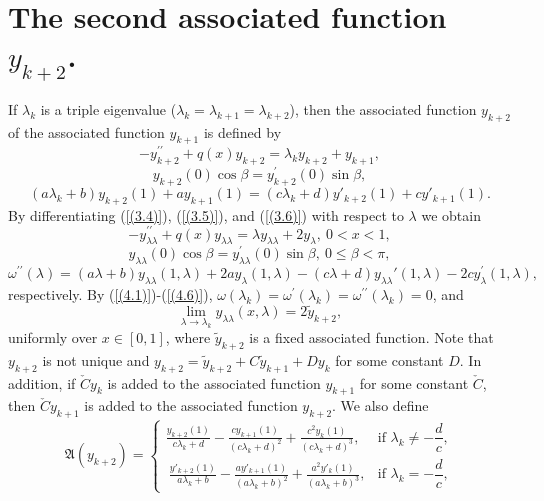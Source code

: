 \documentclass[pdflatex,sn-mathphys-num]{sn-jnl}%
\theoremstyle{thmstyleone}%
\theoremstyle{thmstyletwo}%
\theoremstyle{thmstylethree}%
\theoremstyle{definition}
\theoremstyle{remark}
\numberwithin{equation}{section}
\begin{document}
\section{The second associated function \(y_{k + 2}\).}
If \(\lambda_{k}\) is a triple  eigenvalue
(\(\lambda_{k} = \lambda_{k + 1}=\lambda_{k + 2}\)), then the associated function
\(y_{k + 2}\) of the associated function \(y_{k+1}\) is defined by
\begin{equation}
 -y_{k+2}^{\prime \prime }+q(x)y_{k+2}=\lambda _{k}y_{k+2}+y_{k+1}, \label{(4.1)}  
\end{equation}
\begin{equation}
   y_{k+2}(0)\cos \beta  =y_{k+2}^{\prime }(0)\sin \beta,     \label{(4.2)}
\end{equation}
\begin{equation}
 \left( a\lambda_{k} + b \right)y_{k + 2}(1) + ay_{k + 1}(1) = \left( c\lambda_{k} + d \right)y'_{k + 2}(1) + cy'_{k + 1}(1).  \label{(4.3)}   
\end{equation}
By differentiating (\ref{(3.4)}), (\ref{(3.5)}), and (\ref{(3.6)}) with respect to $\lambda$ we obtain 
\begin{equation}
  -y_{\lambda\lambda}^{\prime \prime }+q(x)y_{\lambda\lambda}=\lambda y_{\lambda\lambda}+2y_{\lambda},\ 0<x<1,  \label{(4.4)} 
\end{equation}
\begin{equation}
y_{\lambda\lambda}(0)\cos \beta =y_{\lambda\lambda}^{\prime }(0)\sin \beta ,\ 0\leq \beta <\pi ,
\label{(4.5)}
\end{equation}
\begin{equation}
 \omega^{\prime\prime}(\lambda) = (a\lambda + b)y_{\lambda\lambda}(1,\lambda)+2ay_\lambda(1,\lambda) - (c\lambda + d)y_{\lambda\lambda}{'}(1,\lambda)-2cy_\lambda^\prime(1,\lambda),\label{(4.6)}   
\end{equation}
respectively. By (\ref{(4.1)})-(\ref{(4.6)}), \(\omega(\lambda_k)=\omega^\prime(\lambda_k)=\omega^{\prime\prime}(\lambda_k)=0\), and 
$$\lim_{\lambda\to\lambda_k}y_{\lambda\lambda}(x,\lambda)=2\tilde{y}_{k+2},$$uniformly over $x\in[0,1]$, where $\tilde{y}_{k+2}$ is a fixed associated function. Note that $y_{k + 2}$ is not unique and $y_{k + 2}=\tilde{y}_{k+2}+C\tilde{y}_{k+1}+Dy_k$ for some constant $D$. In addition, if $\check{C}y_k$ is added to the associated function $y_{k+1}$ for some constant $\check{C}$, then $\check{C}y_{k+1}$ is added to the associated function $y_{k+2}$. We also define 
\begin{equation}
\mathfrak{A}(y_{k+2}) =
\begin{cases}
\displaystyle  
\frac{y_{k + 2}(1)}{c\lambda_{k} + d} - \frac{cy_{k+1}(1)}{\left( c\lambda_{k} + d \right)^{2}}
+\frac{c^2y_{k}(1)}{\left( c\lambda_{k} + d \right)^{3}}, 
&  \text{if }  \lambda_k \neq -\dfrac{d}{c}, \\[10pt]
\displaystyle \ 
\frac{y'_{k + 2}(1)}{a\lambda_{k} + b} - \frac{ay'_{k+1}(1)}{\left( a\lambda_{k} + b \right)^{2}}
+\frac{a^2y'_{k}(1)}{\left( a\lambda_{k} + b\right)^{3}}, 
& \text{if } \lambda_k = -\dfrac{d}{c},
\end{cases}\label{(4.7)}
\end{equation}
\end{document}
